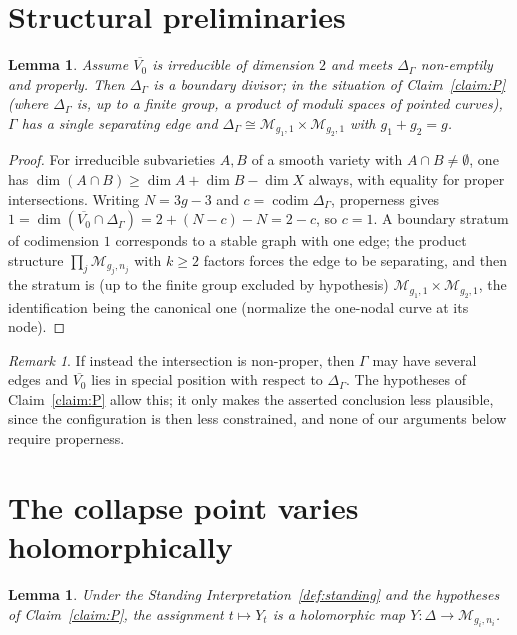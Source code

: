 \documentclass[11pt]{amsart}
\newcommand{\M}{\mathcal{M}}
\theoremstyle{plain}
\newtheorem{lemma}[theorem]{Lemma}
\theoremstyle{definition}
\theoremstyle{remark}
\newtheorem{remark}[theorem]{Remark}
\begin{document}
\section{Structural preliminaries}\label{sec:struct}

\begin{lemma}\label{lem:divisor}
Assume $\overline{V_0}$ is irreducible of dimension $2$ and meets $\Delta_\Gamma$
non-emptily and properly. Then $\Delta_\Gamma$ is a boundary divisor; in the
situation of Claim~\ref{claim:P} (where $\Delta_\Gamma$ is, up to a finite group, a
product of moduli spaces of pointed curves), $\Gamma$ has a single separating edge
and $\Delta_\Gamma\cong \M_{g_1,1}\times\M_{g_2,1}$ with $g_1+g_2=g$.
\end{lemma}

\begin{proof}
For irreducible subvarieties $A,B$ of a smooth variety with $A\cap B\neq\emptyset$,
one has $\dim(A\cap B)\ge \dim A+\dim B-\dim X$ always, with equality for proper
intersections. Writing $N=3g-3$ and $c=\operatorname{codim}\Delta_\Gamma$, properness
gives $1=\dim(\overline{V_0}\cap\Delta_\Gamma)=2+(N-c)-N=2-c$, so $c=1$. A
boundary stratum of codimension $1$ corresponds to a stable graph with one edge; the
product structure $\prod_j \M_{g_j,n_j}$ with $k\ge 2$ factors forces the edge to be
separating, and then the stratum is (up to the finite group excluded by hypothesis)
$\M_{g_1,1}\times\M_{g_2,1}$, the identification being the canonical one (normalize
the one-nodal curve at its node).
\end{proof}

\begin{remark}\label{rem:deep}
If instead the intersection is non-proper, then $\Gamma$ may have several edges and
$\overline{V_0}$ lies in special position with respect to $\Delta_\Gamma$. The
hypotheses of Claim~\ref{claim:P} allow this; it only makes the asserted conclusion
less plausible, since the configuration is then less constrained, and none of our
arguments below require properness.
\end{remark}

\section{The collapse point varies holomorphically}\label{sec:hol}

\begin{lemma}\label{lem:hol}
Under the Standing Interpretation~\ref{def:standing} and the hypotheses of
Claim~\ref{claim:P}, the assignment $t\mapsto Y_t$ is a holomorphic map
$Y:\Delta\to \M_{g_i,n_i}$.
\end{lemma}
\end{document}
